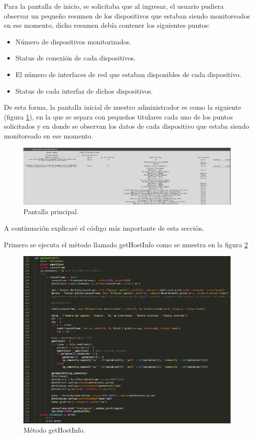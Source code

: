Para la pantalla de inicio, se solicitaba que al ingresar, el usuario pudiera observar un pequeño resumen de los dispositivos que estaban siendo monitoreados en ese momento, dicho resumen debía contener los siguientes puntos:
\begin{itemize}
\item Número de dispositivos monitorizados.
\item Status de conexión de cada dispositivos.
\item El número de interfaces de red que estaban disponibles de cada dispositivo.
\item Status de cada interfaz de dichos dispositivos.
\end{itemize}

De esta forma, la pantalla inicial de nuestro administrador es como la siguiente (figura \ref{image:ejecucionP}), en la que se separa con pequeños titulares cada uno de los puntos solicitados y en donde se observan los datos de cada dispositivo que estaba siendo monitoreado en ese momento.
\FloatBarrier
\begin{figure}[htbp!]
		\centering
	\includegraphics[width=1.1 \textwidth]{images/ejecucionP}
		\caption{Pantalla principal.}		\label{image:ejecucionP}
\end{figure}
\FloatBarrier

A continuación explicaré el código más importante de esta sección.
\\ \par
Primero se ejecuta el método llamado getHostInfo como se muestra en la figura  \ref{image:principal0}
\FloatBarrier
\begin{figure}[htbp!]
		\centering
	\includegraphics[width=.75 \textwidth]{images/principal0}
		\caption{Método getHostInfo.}		\label{image:principal0}
\end{figure}
\FloatBarrier

